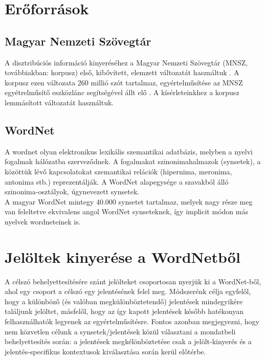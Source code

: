 \documentclass{llncs}
\begin{document}
\section{Er\H{o}forr\'{a}sok}

\subsection{Magyar Nemzeti Sz\"{o}vegt\'{a}r}

A disztrib\'{u}ci\'{o}s inform\'{a}ci\'{o} kinyer\'{e}s\'{e}hez a Magyar Nemzeti Sz\"{o}vegt\'{a}r \cite{korpusz} (MNSZ, tov\'{a}bbiakban: korpusz) els\H{o}, kib\H{o}v\'{i}tett, elemzett v\'{a}ltozat\'{a}t haszn\'{a}ltuk \cite{korpusz,korpusz2}. A korpusz ezen v\'{a}ltozata 260 milli\'{o} sz\'{o}t tartalmaz, egy\'{e}rtelm\H{u}s\'{i}t\'{e}se az MNSZ egy\'{e}trelm\H{u}s\'{i}t\H{o} eszk\"{o}zl\'{a}nc seg\'{i}ts\'{e}g\'{e}vel \'{a}llt el\H{o} \cite{tagger}. A k\'{i}s\'{e}rleteinkhez a korpusz lemm\'{a}s\'{i}tott v\'{a}ltozat\'{a}t haszn\'{a}ltuk. 


\subsection{WordNet}


A wordnet olyan elektronikus lexik\'{a}lis szemantikai adatb\'{a}zis, melyben a nyelvi fogalmak h\'{a}l\'{o}zatba szervez\H{o}dnek. A fogalmakat szinonimahalmazok (synsetek), a k\"{o}z\"{o}tt\"{u}k l\'{e}v\H{o} kapcsolatokat szemantikai rel\'{a}ci\'{o}k (hipernima, meronima, antonima stb.) reprezent\'{a}lj\'{a}k. A WordNet alapegys\'{e}ge a szavakb\'{o}l \'{a}ll\'{o} szinonima-oszt\'{a}lyok, \'{u}gynevezett synsetek. \\
A magyar WordNet \cite{mihaltz08} mintegy 40.000 synsetet tartalmaz, melyek nagy r\'{e}sze meg van feleltetve ekvivalens angol WordNet synseteknek, \'{i}gy implicit m\'{o}don m\'{a}s nyelvek wordneteinek is.

\section{Jel\"{o}ltek kinyer\'{e}se a WordNetb\H{o}l}

A c\'{e}lsz\'{o} behelyettes\'{i}t\'{e}s\'{e}re sz\'{a}nt jel\"{o}lteket csoportosan nyerj\"{u}k ki a WordNet-b\H{o}l, ahol egy csoport a c\'{e}lsz\'{o} egy jelent\'{e}s\'{e}nek felel meg. M\'{o}dszer\'{e}nk c\'{e}lja egyfel\H{o}l, hogy a k\"{u}l\"{o}nb\"{o}z\H{o} (\'{e}s val\'{o}ban megk\"{u}l\"{o}nb\"{o}ztetend\H{o}) jelent\'{e}sek mindegyik\'{e}re tal\'{a}ljunk jel\"{o}ltet, m\'{a}sfel\H{o}l, hogy az \'{i}gy kapott jelent\'{e}sek k\'{e}s\H{o}bb hat\'{e}konyan felhaszn\'{a}lhat\'{o}k legyenek az egy\'{e}rtelm\H{u}s\'{i}t\'{e}sre. Fontos azonban megjegyezni, hogy nem k\"{o}zvetlen c\'{e}lunk a synsetek/jelent\'{e}sek k\"{o}z\"{u}l v\'{a}lasztani a mondatbeli behelyettes\'{i}t\'{e}s sor\'{a}n: a jelent\'{e}sek megk\'{e}l\"{o}nb\"{o}ztet\'{e}se csak a jel\"{o}lt-kinyer\'{e}s \'{e}s a jelent\'{e}s-specifikus kontextusok kiv\'{a}laszt\'{a}sa sor\'{a}n ker\"{u}l el\H{o}t\'{e}rbe.\\
\end{document}
